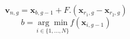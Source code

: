 \begin{equation}
\mathbf{v}_{n,g}=\mathbf{x}_{b,g-1}+F. \left(\mathbf{x}_{r_{1},g}-\mathbf{x}_{r_{2},g}\right)
\label{best_mutation}
\end{equation}
$$
b=\underset{i \in\{1, \ldots, N\}}{\arg \min } f\left(\mathbf{x}_{i,g-1}\right)
$$